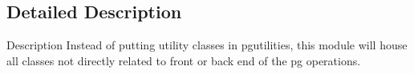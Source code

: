 \subsection{Detailed Description}
\begin{DoxyVerb}Description
Instead of putting utility classes in pgutilities,
this module will house all classes not directly related
to front or back end of the pg operations.
\end{DoxyVerb}
 